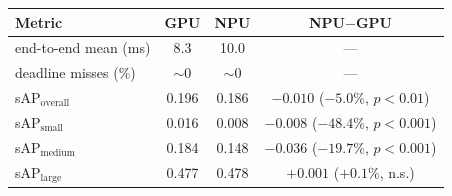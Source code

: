 \begin{tabular}{lccc}
\toprule
Metric & GPU & NPU & NPU$-$GPU \\
\midrule
end-to-end mean (ms) & 8.3 & 10.0 & --- \\
deadline misses (\%) & $\sim\!0$ & $\sim\!0$ & --- \\
sAP$_{\text{overall}}$ & 0.196 & 0.186 & $-0.010$ ($-5.0\%$, $p<0.01$) \\
sAP$_{\text{small}}$ & 0.016 & 0.008 & $-0.008$ ($-48.4\%$, $p<0.001$) \\
sAP$_{\text{medium}}$ & 0.184 & 0.148 & $-0.036$ ($-19.7\%$, $p<0.001$) \\
sAP$_{\text{large}}$ & 0.477 & 0.478 & $+0.001$ ($+0.1\%$, n.s.) \\
\bottomrule
\end{tabular}
